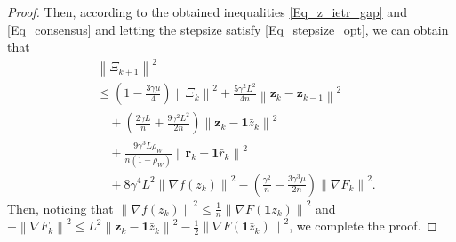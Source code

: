 \documentclass[letterpaper, 10 pt, conference]{ieeeconf}
\begin{document}
\begin{proof}
Then, according to the obtained inequalities \eqref{Eq_z_ietr_gap} and \eqref{Eq_consensus} and letting the stepsize satisfy \eqref{Eq_stepsize_opt}, we can obtain that
\begin{equation*}
\begin{aligned}
&\left\| \varXi _{k+1} \right\| ^2
\\
&\leqslant \left( 1-\frac{3\gamma \mu}{4} \right) \left\| \varXi _k \right\| ^2+\frac{5\gamma ^2L^2}{4n}\left\| \mathbf{z}_k-\mathbf{z}_{k-1} \right\| ^2
\\
&\quad+\left( \frac{2\gamma L}{n}+\frac{9\gamma ^2L^2}{2n} \right) \left\| \mathbf{z}_k-\mathbf{1}\bar{z}_k \right\| ^2
\\
&\quad+\frac{9\gamma ^3L\rho _W}{n\left( 1-\rho _W \right)}\left\| \mathbf{r}_k-\mathbf{1}\bar{r}_k \right\| ^2
\\
&\quad+8\gamma ^4L^2\left\| \nabla f\left( \bar{z}_k \right) \right\| ^2-\left( \frac{\gamma ^2}{n}-\frac{3\gamma ^3\mu}{2n} \right) \left\| \nabla F_k \right\| ^2.
\end{aligned}
\end{equation*}
Then, noticing that $\left\| \nabla f\left( \bar{z}_k \right) \right\| ^2\leqslant \frac{1}{n}\left\| \nabla F\left( \mathbf{1}\bar{z}_k \right) \right\| ^2$ and
$-\left\| \nabla F_k \right\| ^2\leqslant L^2\left\| \mathbf{z}_k-\mathbf{1}\bar{z}_k \right\| ^2-\frac{1}{2}\left\| \nabla F\left( \mathbf{1}\bar{z}_k \right) \right\| ^2$, we complete the proof.
\end{proof}


% 


\end{document}
